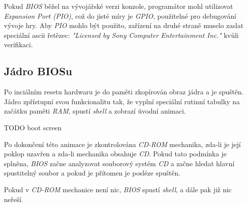 Pokud \textit{BIOS} běžel na vývojářské verzi konzole, programátor mohl utilizovat \textit{Expansion Port (PIO)}, což
do jisté míry je \textit{GPIO}, použitelné pro debugování vývoje hry. Aby \textit{PIO} mohlo být použito,
zařízení na druhé straně muselo zaslat speciální ascii řetězec: \textit{"Licensed by Sony Computer Entertainment Inc."} kvůli verifikaci.

\subsection{Jádro BIOSu}

Po inciálním resetu hardwaru je do paměti zkopírován obraz jádra a je spuštěn. Jádro zpřístupní svou funkcionalitu tak, že
vyplní speciální rutinní tabulky na začátku paměti \textit{RAM}, spustí \textit{shell} a zobrazí úvodní animaci. 

TODO boot screen

Po dokončení této animace je zkontrolována \textit{CD-ROM} mechanika, zda-li je její poklop uzavřen a zda-li mechanika obsahuje
\textit{CD}. Pokud tato podmínka je splněna, \textit{BIOS} začne analyzovat souborový systém \textit{CD} a začne hledat
hlavní spustitelný soubor a pokud je přítomen je posléze spuštěn. 

Pokud v \textit{CD-ROM} mechanice není nic, \textit{BIOS} spustí \textit{shell}, a dále pak již nic neřeší.
